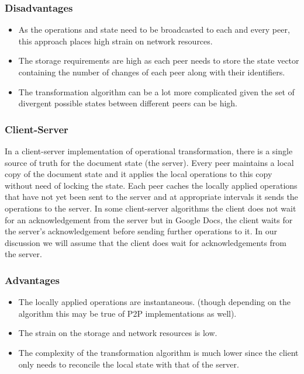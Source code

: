 \documentclass[12pt]{article}
\begin{document}
  \subsubsection*{Disadvantages}
  \begin{itemize}
    \item As the operations and state need to be broadcasted to each and every peer, this approach places high strain on network resources.
    \item The storage requirements are high as each peer needs to store the state vector containing the number of changes of each peer along with their identifiers.
    \item The transformation algorithm can be a lot more complicated given the set of divergent possible states between different peers can be high. 
  \end{itemize}

  \subsubsection{Client-Server}
  In a client-server implementation of operational transformation, there is a single source of truth for the document state (the server).
  Every peer maintains a local copy of the document state and it applies the local operations to this copy without need of locking the state.
  Each peer caches the locally applied operations that have not yet been sent to the server and at appropriate intervals it sends the operations to the server.
  In some client-server algorithms the client does not wait for an acknowledgement from the server but in Google Docs,
  the client waits for the server's acknowledgement before sending further operations to it.
  In our discussion we will assume that the client does wait for acknowledgements from the server.

  \subsubsection*{Advantages}
  \begin{itemize}
    \item The locally applied operations are instantaneous. (though depending on the algorithm this may be true of P2P implementations as well).
    \item The strain on the storage and network resources is low.
    \item The complexity of the transformation algorithm is much lower since the client only needs to reconcile the local state with that of the server.
  \end{itemize}
\end{document}
